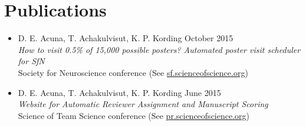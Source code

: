 \section{\sc Publications}

\begin{itemize}[leftmargin=0cm, label={}]

\item D. E. Acuna, T. Achakulvisut, K. P. Kording \hfill October 2015\\
{\em How to visit 0.5\% of 15,000 possible posters? Automated poster visit scheduler for SfN}\\ Society for Neuroscience conference (See \href{http://sf.scienceofscience.org/}{sf.scienceofscience.org})

\item D. E. Acuna, T. Achakulvisut, K. P. Kording \hfill June 2015\\
{\em Website for Automatic Reviewer Assignment and Manuscript Scoring}\\
Science of Team Science conference (See \href{http://pr.scienceofscience.org/}{pr.scienceofscience.org})

\end{itemize}
